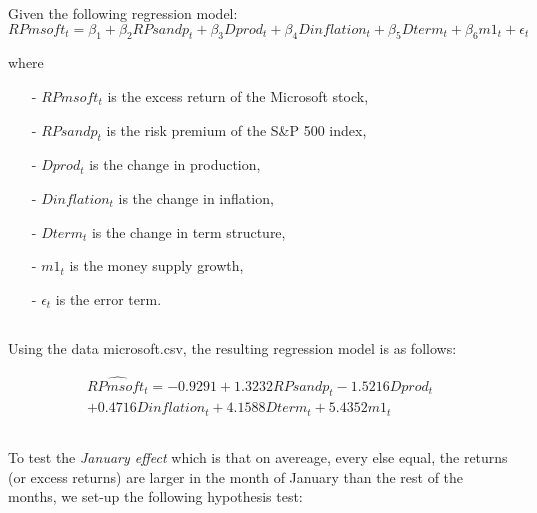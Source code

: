 Given the following regression model:
$$
RPmsoft_t = \beta_1 + \beta_2RPsandp_t + \beta_3 Dprod_t + \beta_4Dinflation_t + \beta_5Dterm_t + \beta_6m1_t + \epsilon_t
$$

where 
\begin{itemize}[label=(alpha*)]
    \item[-] $RPmsoft_t$ is the excess return of the Microsoft stock,
    \item[-] $RPsandp_t$ is the risk premium of the S\&P 500 index,
    \item[-] $Dprod_t$ is the change in production,
    \item[-] $Dinflation_t$ is the change in inflation,
    \item[-] $Dterm_t$ is the change in term structure,
    \item[-] $m1_t$ is the money supply growth,
    \item[-] $\epsilon_t$ is the error term.
\end{itemize}

\subsection{}
Using the data microsoft.csv, the resulting regression model is as follows:

\begin{align*}
\widehat{RPmsoft_t} = -0.9291 + 1.3232RPsandp_t -1.5216Dprod_t \\  + 0.4716Dinflation_t + 4.1588Dterm_t + 5.4352m1_t 
\end{align*}

\begin{center}
\end{center}

\subsection{}
To test the \textit{January effect} which is that on avereage, every else equal, the returns (or excess returns) are larger in the month of January than the rest of the months, we set-up the following hypothesis test:

